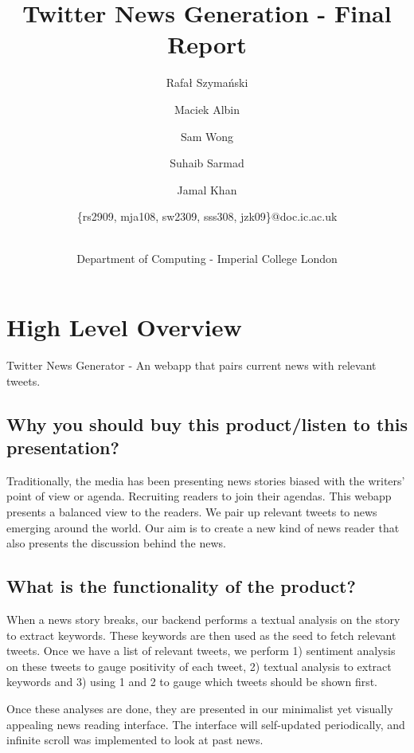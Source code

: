 \documentclass{report}
\title{Twitter News Generation - Final Report}
\author{
    \small{Rafał Szymański}\\
  	\and
    \small{Maciek Albin}\\
    \and
    \small{Sam Wong}\\
    \and  
    \small{Suhaib Sarmad}\\
		\and
		\small{Jamal Khan}\\
		\and
		\small{\{rs2909, mja108, sw2309, sss308, jzk09\}@doc.ic.ac.uk}
		\and
		\\Department of Computing - Imperial College London
}
\begin{document}
 
	\maketitle
	\tableofcontents
	\newpage

	\chapter{High Level Overview}
	
	Twitter News Generator - An webapp that pairs current news with relevant tweets.

	\section{Why you should buy this product/listen to this presentation?}

	Traditionally, the media has been presenting news stories biased with the writers’ point of view or agenda. Recruiting readers to join their agendas. This webapp presents a balanced view to the readers. We pair up relevant tweets to news emerging around the world. Our aim is to create a new kind of news reader that also presents the discussion behind the news. 
	
	\section{What is the functionality of the product?}

	When a news story breaks, our backend performs a textual analysis on the story to extract keywords. These keywords are then used as the seed to fetch relevant tweets. Once we have a list of relevant tweets, we perform 1) sentiment analysis on these tweets to gauge positivity of each tweet, 2) textual analysis to extract keywords and 3) using 1 and 2 to gauge which tweets should be shown first.

	Once these analyses are done, they are presented in our minimalist yet visually appealing news reading interface. The interface will self-updated periodically, and infinite scroll was implemented to look at past news.
	
\end{document}
